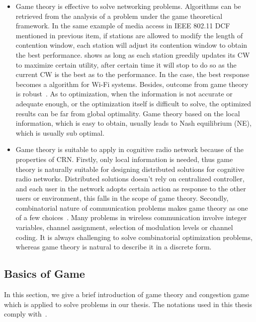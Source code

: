 \begin{itemize}
\item Game theory is effective to solve networking problems.
Algorithms can be retrieved from the analysis of a problem under the game theoretical framework.
In the same example of media access in IEEE 802.11 DCF mentioned in previous item, if stations are allowed to modify the length of contention window, each station will adjust its contention window to obtain the best performance.
\cite{contentiongame_07} shows as long as each station greedily updates its CW to maximize certain utility, after certain time it will stop to do so as the current CW is the best as to the performance.
In the case, the best response becomes a algorithm for Wi-Fi systems.
%
Besides, outcome from game theory is robust~\cite{Han:2008:RAW:1457343}.
As to optimization, when the information is not accurate or adequate enough, or the optimization itself is difficult to solve, the optimized results can be far from global optimality.
Game theory based on the local information, which is easy to obtain, usually leads to Nash equilibrium (\gls{NE}), which is usually sub optimal.


\item Game theory is suitable to apply in cognitive radio network because of the properties of CRN.
Firstly, only local information is needed, thus game theory is naturally suitable for designing distributed solutions for cognitive radio networks.
Distributed solutions doesn't rely on centralized controller, and each user in the network adopts certain action as response to the other users or environment, this falls in the scope of game theory.
%
Secondly, combinatorial nature of communication problems makes game theory as one of a few choices~\cite{Han:2008:RAW:1457343}.
Many problems in wireless communication involve integer variables, \ie channel assignment, selection of modulation levels or channel coding.
It is always challenging to solve combinatorial optimization problems, whereas game theory is natural to describe it in a discrete form.

\end{itemize}




 

\subsection{Basics of Game}
In this section, we give a brief introduction of game theory and congestion game which is applied to solve problems in our thesis.
The notations used in this thesis comply with~\cite{agt_book}.



